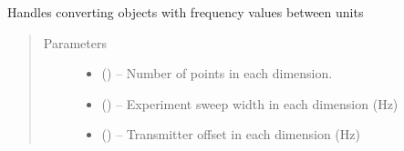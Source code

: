 \documentclass[letterpaper,10pt,english]{sphinxmanual}
\begin{document}
\begin{fulllineitems}
\label{\detokenize{references/misc:nmrespy._misc.FrequencyConverter}}
\sphinxAtStartPar
Handles converting objects with frequency values between units
\begin{quote}\begin{description}
\item[{Parameters}] \leavevmode\begin{itemize}
\item {} 
\sphinxAtStartPar
{} (\sphinxstyleliteralemphasis{\sphinxupquote{{[}}}\sphinxstyleliteralemphasis{\sphinxupquote{{]} or }}\sphinxstyleliteralemphasis{\sphinxupquote{{[}}}\sphinxstyleliteralemphasis{\sphinxupquote{, }}\sphinxstyleliteralemphasis{\sphinxupquote{{]}}}) – Number of points in each dimension.

\item {} 
\sphinxAtStartPar
{} (\sphinxstyleliteralemphasis{\sphinxupquote{{[}}}\sphinxstyleliteralemphasis{\sphinxupquote{{]} or }}\sphinxstyleliteralemphasis{\sphinxupquote{{[}}}\sphinxstyleliteralemphasis{\sphinxupquote{, }}\sphinxstyleliteralemphasis{\sphinxupquote{{]}}}) – Experiment sweep width in each dimension (Hz)

\item {} 
\sphinxAtStartPar
{} (\sphinxstyleliteralemphasis{\sphinxupquote{{[}}}\sphinxstyleliteralemphasis{\sphinxupquote{{]} or }}\sphinxstyleliteralemphasis{\sphinxupquote{{[}}}\sphinxstyleliteralemphasis{\sphinxupquote{, }}\sphinxstyleliteralemphasis{\sphinxupquote{{]}}}) – Transmitter offset in each dimension (Hz)


\end{itemize}
\end{description}
\end{quote}
\end{fulllineitems}
\end{document}
